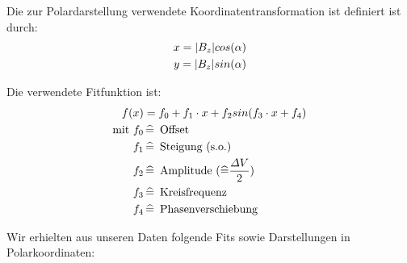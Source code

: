 \documentclass[12pt]{article}
\begin{document}
\hspace{20pt}
Die zur Polardarstellung verwendete Koordinatentransformation ist definiert ist durch:
\begin{align}
 \notag x=|B_z| cos(\alpha) \\
 \notag y=|B_z| sin(\alpha)
\end{align}

Die verwendete Fitfunktion ist:
\begin{align}
 \notag f(x) &= f_0 + f_1 \cdot x + f_2 sin(f_3 \cdot x + f_4) \\
 \notag \textnormal{mit } f_0 &\mathop{\widehat{=}} \textnormal{ Offset } \\
 \notag  f_1 &\mathop{\widehat{=}} \textnormal{ Steigung (s.o.) } \\
 \notag  f_2 &\mathop{\widehat{=}} \textnormal{ Amplitude } (\widehat{=} \frac{\varDelta V}{2}) \\
 \notag  f_3 &\mathop{\widehat{=}} \textnormal{ Kreisfrequenz } \\
 \notag  f_4 &\mathop{\widehat{=}} \textnormal{ Phasenverschiebung }
\end{align}

Wir erhielten aus unseren Daten folgende Fits sowie Darstellungen in Polarkoordinaten:
\end{document}
